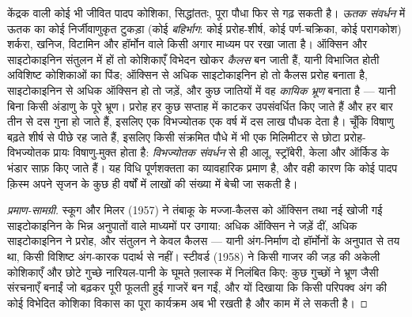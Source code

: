 \begin{proposition}\label{prop:b2:asexual-reproduction:tissueculture}
केंद्रक वाली कोई भी जीवित पादप कोशिका, सिद्धांततः, पूरा पौधा फिर से गढ़
सकती है। \emph{ऊतक संवर्धन} में ऊतक का कोई निर्जीवाणुकृत टुकड़ा
(कोई \emph{बहिर्भाग}: कोई प्ररोह-शीर्ष, कोई पर्ण-चक्रिका, कोई परागकोश)
शर्करा, खनिज, विटामिन और हॉर्मोन वाले किसी अगार माध्यम पर रखा जाता है।
ऑक्सिन और साइटोकाइनिन संतुलन में हों तो कोशिकाएँ विभेदन खोकर
\emph{कैलस} बन जाती हैं, यानी विभाजित होती अविशिष्ट कोशिकाओं का पिंड;
ऑक्सिन से अधिक साइटोकाइनिन हो तो कैलस प्ररोह बनाता है, साइटोकाइनिन से
अधिक ऑक्सिन हो तो जड़ें, और कुछ जातियों में वह \emph{कायिक
भ्रूण} बनाता है --- यानी बिना किसी अंडाणु के पूरे भ्रूण। प्ररोह हर कुछ
सप्ताह में काटकर उपसंवर्धित किए जाते हैं और हर बार तीन से
दस गुना हो जाते हैं, इसलिए एक विभज्योतक एक वर्ष में दस लाख पौधक देता
है। चूँकि विषाणु बढ़ते शीर्ष से पीछे रह जाते हैं, इसलिए किसी संक्रमित
पौधे में भी एक मिलिमीटर से छोटा प्ररोह-विभज्योतक प्रायः विषाणु-मुक्त
होता है: \emph{विभज्योतक संवर्धन} से ही आलू, स्ट्रॉबेरी, केला और
ऑर्किड के भंडार साफ़ किए जाते हैं। यह विधि पूर्णशक्तता का
व्यावहारिक प्रमाण है, और वही कारण कि कोई पादप क़िस्म अपने सृजन के कुछ ही
वर्षों में लाखों की संख्या में बेची जा सकती है।
\end{proposition}
\begin{proof}[प्रमाण-सामग्री]
स्कूग और मिलर (1957) ने तंबाकू के मज्जा-कैलस को ऑक्सिन तथा नई खोजी गई
साइटोकाइनिन के भिन्न अनुपातों वाले माध्यमों पर उगाया: अधिक
ऑक्सिन ने जड़ें दीं, अधिक साइटोकाइनिन ने प्ररोह, और संतुलन ने केवल
कैलस --- यानी अंग-निर्माण दो हॉर्मोनों के अनुपात से तय था, किसी
विशिष्ट अंग-कारक पदार्थ से नहीं। स्टीवर्ड (1958) ने किसी गाजर की जड़ की
अकेली कोशिकाएँ और छोटे गुच्छे नारियल-पानी के घूमते फ़्लास्क में निलंबित
किए: कुछ गुच्छों ने भ्रूण जैसी संरचनाएँ बनाईं जो बढ़कर पूरी फूलती हुई
गाजरें बन गईं, और यों दिखाया कि किसी परिपक्व अंग की कोई विभेदित
कोशिका विकास का पूरा कार्यक्रम अब भी रखती है और काम में ले सकती है।
\end{proof}

